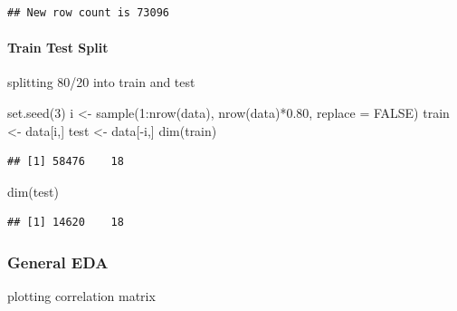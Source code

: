 \documentclass[
]{article}
\newenvironment{Shaded}{\begin{snugshade}}{\end{snugshade}}
\newcommand{\AttributeTok}[1]{\textcolor[rgb]{0.77,0.63,0.00}{#1}}
\newcommand{\ConstantTok}[1]{\textcolor[rgb]{0.00,0.00,0.00}{#1}}
\newcommand{\DecValTok}[1]{\textcolor[rgb]{0.00,0.00,0.81}{#1}}
\newcommand{\FloatTok}[1]{\textcolor[rgb]{0.00,0.00,0.81}{#1}}
\newcommand{\FunctionTok}[1]{\textcolor[rgb]{0.00,0.00,0.00}{#1}}
\newcommand{\NormalTok}[1]{#1}
\newcommand{\OtherTok}[1]{\textcolor[rgb]{0.56,0.35,0.01}{#1}}
\newcommand{\SpecialCharTok}[1]{\textcolor[rgb]{0.00,0.00,0.00}{#1}}
\newcommand{\StringTok}[1]{\textcolor[rgb]{0.31,0.60,0.02}{#1}}
\begin{document}
\begin{verbatim}
## New row count is 73096
\end{verbatim}

\hypertarget{train-test-split}{%
\paragraph{Train Test Split}\label{train-test-split}}

splitting 80/20 into train and test

\begin{Shaded}
\begin{Highlighting}[]
\FunctionTok{set.seed}\NormalTok{(}\DecValTok{3}\NormalTok{)}
\NormalTok{i }\OtherTok{\textless{}{-}} \FunctionTok{sample}\NormalTok{(}\DecValTok{1}\SpecialCharTok{:}\FunctionTok{nrow}\NormalTok{(data), }\FunctionTok{nrow}\NormalTok{(data)}\SpecialCharTok{*}\FloatTok{0.80}\NormalTok{, }\AttributeTok{replace =} \ConstantTok{FALSE}\NormalTok{)}
\NormalTok{train }\OtherTok{\textless{}{-}}\NormalTok{ data[i,]}
\NormalTok{test }\OtherTok{\textless{}{-}}\NormalTok{ data[}\SpecialCharTok{{-}}\NormalTok{i,]}
\FunctionTok{dim}\NormalTok{(train)}
\end{Highlighting}
\end{Shaded}

\begin{verbatim}
## [1] 58476    18
\end{verbatim}

\begin{Shaded}
\begin{Highlighting}[]
\FunctionTok{dim}\NormalTok{(test)}
\end{Highlighting}
\end{Shaded}

\begin{verbatim}
## [1] 14620    18
\end{verbatim}

\hypertarget{general-eda}{%
\subsubsection{General EDA}\label{general-eda}}

plotting correlation matrix

\begin{Shaded}
\end{Shaded}
\end{document}
